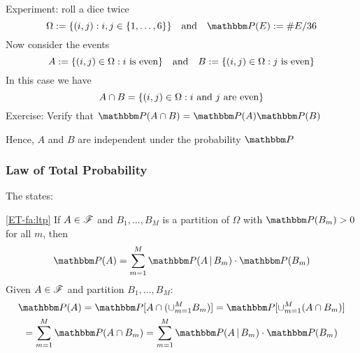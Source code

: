 \begin{frame}

    \vspace{2em}
    \Eg
        Experiment: roll a dice twice  
        \begin{equation*}
            \Omega := \setntn{(i, j)}{ i, j \in \{1,\ldots,6\}}
            \quad \text{and} \quad
            \PP(E) := \# E / 36
        \end{equation*}
        Now consider the events 
        \begin{equation*}
            A := \{ (i, j) \in \Omega : i \text{ is even} \}
            \quad \text{and} \quad
            B := \{ (i, j) \in \Omega : j \text{ is even} \}
        \end{equation*}
        In this case we have
        \begin{equation*}
            A \cap B = \{ (i, j) \in \Omega : i \text{ and } j  \text{ are even} \}
        \end{equation*}
        Exercise: Verify that $\PP(A \cap B) = \PP(A) \PP(B)$

        Hence, $A$ and $B$ are independent under the probability $\PP$
        
\end{frame}

\begin{frame}\frametitle{Law of Total Probability}

    \vspace{2em}
    The  states:
    
    \Fact\eqref{ET-fa:ltp}
    If $A \in \mathscr F$ and $B_1,\ldots, B_M$ is a partition of $\Omega$ with
    $\PP(B_m) > 0$ for all $m$, then
    \begin{equation*}
      \PP(A) = \sum_{m=1}^M \PP(A \, | \, B_m) \cdot \PP(B_m)
    \end{equation*}
    \Prf
        Given $A \in \mathscr F$ and partition $B_1,\ldots, B_M$:
        \begin{multline*}
            \PP(A) = \PP[A \cap (\cup_{m=1}^M B_m) ]
              = \PP[\cup_{m=1}^M (A \cap B_m)] \\
              = \sum_{m=1}^M \PP(A \cap B_m) 
              = \sum_{m=1}^M \PP(A \,|\, B_m) \cdot \PP(B_m)
        \end{multline*}
\end{frame}

